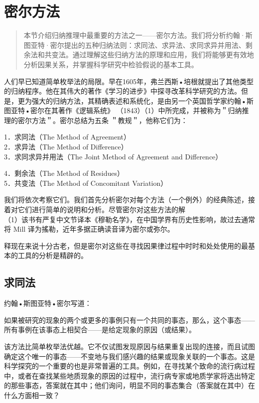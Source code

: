 \section{密尔方法}

\begin{quotation}
本节介绍归纳推理中最重要的方法之一——密尔方法。我们将分析约翰·斯图亚特·密尔提出的五种归纳法则：求同法、求异法、求同求异并用法、剩余法和共变法。通过理解这些归纳方法的原理和应用，我们将能够更有效地分析因果关系，并掌握科学研究中检验假说的基本工具。
\end{quotation}

人们早已知道简单枚举法的局限。早在1605年，弗兰西斯•培根就提出了其他类型的归纳程序。他在其伟大的著作《学习的进步》中探寻改革科学研究的方法。但是，更为强大的归纳方法，其精确表述和系统化，是由另一个英国哲学家约翰•斯图亚特•密尔在其著作《逻辑系统》 （1843）（1）中所完成，并被称为＂归纳推理的密尔方法＂。密尔总结为五条 ＂教规＂，他称它们为：

1．求同法（The Method of Agreement）\\
2．求异法（The Method of Difference）\\
3．求同求异并用法（The Joint Method of Agreement and Difference）

4．剩余法（The Method of Residues）\\
5．共变法（The Method of Concomitant Variation）

我们将依次考察它们。我们首先分析密尔对每个方法（一个例外）的经典陈述，接着对它们进行简单的说明和分析。尽管密尔对这些方法的解\\
（1）该书有严复中文节译本《穆勒名学》，在中国学界有历史性影响，故过去通常将 Mill 译为搖勒，近年多据正确读音译为密尔或弥尔。

释现在来说十分古老，但是密尔对这些在寻找因果律过程中时时和处处使用的最基本的工具的分析是精辟的。

\subsection{求同法}
约翰•斯图亚特•密尔写道：

如果被研究的现象的两个或更多的事例只有一个共同的事态，那么，这个事态——所有事例在该事态上相契合——是给定现象的原因（或结果）。

该方法比简单枚举法优越。它不仅试图发现原因与结果重复出现的连接，而且试图确定这个唯一的事态——不变地与我们感兴趣的结果或现象关联的一个事态。这是科学探究的一个重要的也是非常普遍的工具。例如，在寻找某个致命的流行病过程中，或者在查找某些地质现象的原因的过程中，流行病专家或地质学家将选出特定的那些事态，答案就在其中；他们询问，明显不同的事态集合（答案就在其中）在什么方面相一致？

